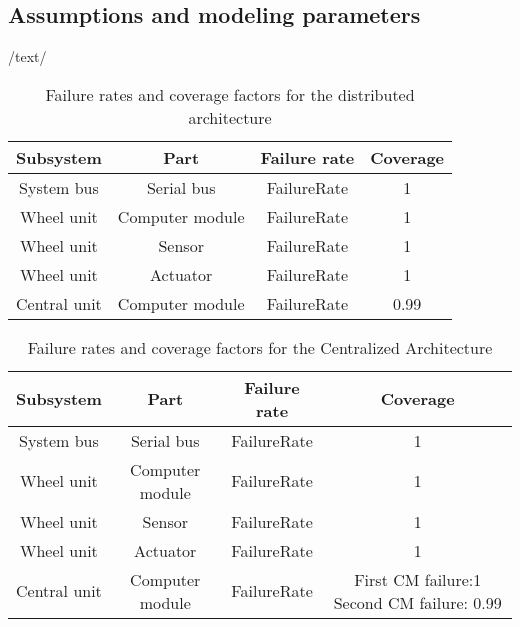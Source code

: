 \subsection{Assumptions and modeling parameters}
/text/
\begin{table}[h]
\centering
\begin{tabular}{| c | c | c | c |}
\hline 
Subsystem & Part & Failure rate & Coverage\\
\hline
System bus & Serial bus& FailureRate & 1\\
\hline
Wheel unit & Computer module & FailureRate & 1\\
\hline
Wheel unit & Sensor & FailureRate & 1\\
\hline
Wheel unit & Actuator & FailureRate & 1\\
\hline
Central unit & Computer module & FailureRate & 0.99\\
\hline
\end{tabular}
\caption{Failure rates and coverage factors for the distributed architecture}
\label{tab:Put a Lable}
\end{table}
\begin{table}[h]
\centering
\begin{tabular}{| c | c | c | c |}
\hline 
Subsystem & Part & Failure rate & Coverage\\
\hline
System bus & Serial bus& FailureRate & 1\\
\hline
Wheel unit & Computer module & FailureRate & 1\\
\hline
Wheel unit & Sensor & FailureRate & 1\\
\hline
Wheel unit & Actuator & FailureRate & 1\\
\hline
Central unit & Computer module & FailureRate & First CM failure:1 Second CM failure: 0.99\\
\hline
\end{tabular}
\caption{Failure rates and coverage factors for the Centralized Architecture}
\label{tab:Put a Lable}
\end{table}
